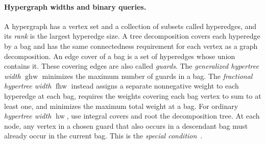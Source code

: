 \paragraph{Hypergraph widths and binary queries.}
A hypergraph has a vertex set and a collection of subsets called
hyperedges, and its \emph{rank} is the largest hyperedge size.
A tree decomposition covers each hyperedge by a bag and has the
same connectedness requirement for each vertex as a graph
decomposition. An edge cover of a bag is a set of hyperedges
whose union contains it. These covering edges are also called
\emph{guards}. The \emph{generalized hypertree width}
$\operatorname{ghw}$ minimizes the maximum number of guards in
a bag. The \emph{fractional hypertree width} $\operatorname{fhw}$
instead assigns a separate nonnegative weight to each hyperedge
at each bag, requires the
weights covering each bag vertex to sum to at least one, and
minimizes the maximum total weight at a bag.
For ordinary \emph{hypertree width} $\operatorname{hw}$, use
integral covers and root the decomposition tree. At each node,
any vertex in a chosen guard that also occurs in a descendant
bag must already occur in the current bag. This is the
\emph{special condition}~\cite[Definitions~2.4--2.7 in the full version]{GottlobEtAlHypertree}.

